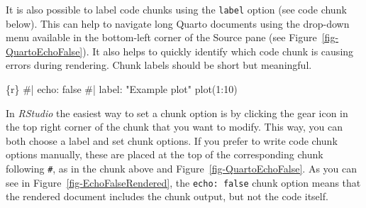 \documentclass[
  letterpaper,
  DIV=11,
  numbers=noendperiod]{scrreprt}
\newenvironment{Shaded}{\begin{snugshade}}{\end{snugshade}}
\newcommand{\CommentTok}[1]{\textcolor[rgb]{0.37,0.37,0.37}{#1}}
\newcommand{\DecValTok}[1]{\textcolor[rgb]{0.68,0.00,0.00}{#1}}
\newcommand{\FunctionTok}[1]{\textcolor[rgb]{0.28,0.35,0.67}{#1}}
\newcommand{\InformationTok}[1]{\textcolor[rgb]{0.37,0.37,0.37}{#1}}
\newcommand{\NormalTok}[1]{\textcolor[rgb]{0.00,0.23,0.31}{#1}}
\newcommand{\SpecialCharTok}[1]{\textcolor[rgb]{0.37,0.37,0.37}{#1}}
\begin{document}
It is also possible to label code chunks using the \texttt{label} option
(see code chunk below). This can help to navigate long Quarto documents
using the drop-down menu available in the bottom-left corner of the
Source pane (see Figure~\ref{fig-QuartoEchoFalse}). It also helps to
quickly identify which code chunk is causing errors during rendering.
Chunk labels should be short but meaningful.

\begin{Shaded}
\begin{Highlighting}[]
\InformationTok{\textasciigrave{}\textasciigrave{}\textasciigrave{}\{r\}}
\CommentTok{\#| echo: false}
\CommentTok{\#| label: "Example plot"}
\FunctionTok{plot}\NormalTok{(}\DecValTok{1}\SpecialCharTok{:}\DecValTok{10}\NormalTok{)}
\InformationTok{\textasciigrave{}\textasciigrave{}\textasciigrave{}}
\end{Highlighting}
\end{Shaded}

In \emph{RStudio} the easiest way to set a chunk option is by clicking
the gear icon in the top right corner of the chunk that you want to
modify. This way, you can both choose a label and set chunk options. If
you prefer to write code chunk options manually, these are placed at the
top of the corresponding chunk following \texttt{\#\textbar{}}, as in
the chunk above and Figure~\ref{fig-QuartoEchoFalse}. As you can see in
Figure~\ref{fig-EchoFalseRendered}, the \texttt{echo:\ false} chunk
option means that the rendered document includes the chunk output, but
not the code itself.
\end{document}
